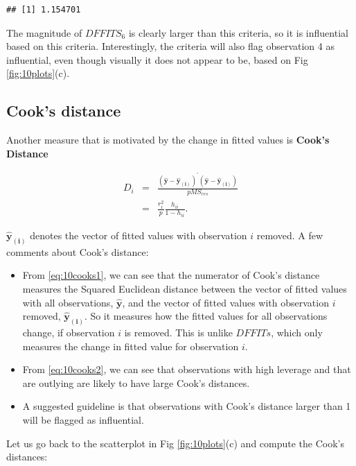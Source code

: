 \documentclass[
]{book}
\begin{document}
\begin{verbatim}
## [1] 1.154701
\end{verbatim}

The magnitude of \(DFFITS_6\) is clearly larger than this criteria, so it is influential based on this criteria. Interestingly, the criteria will also flag observation 4 as influential, even though visually it does not appear to be, based on Fig \ref{fig:10plots}(c).

\hypertarget{cooks-distance}{%
\subsection{Cook's distance}\label{cooks-distance}}

Another measure that is motivated by the change in fitted values is \textbf{Cook's Distance}

\begin{eqnarray}
D_i &=& \frac{\left( \boldsymbol{\hat{y}} - \boldsymbol{\hat{y}_{(i)}} \right)^{\prime} \left( \boldsymbol{\hat{y}} - \boldsymbol{\hat{y}_{(i)}} \right)}{p MS_{res}} \label{eq:10cooks1} \\
    &=& \frac{r_i^2}{p}\frac{h_{ii}}{1-h_{ii}}. \label{eq:10cooks2}
\end{eqnarray}

\(\boldsymbol{\hat{y}_{(i)}}\) denotes the vector of fitted values with observation \(i\) removed. A few comments about Cook's distance:

\begin{itemize}
\item
  From \eqref{eq:10cooks1}, we can see that the numerator of Cook's distance measures the Squared Euclidean distance between the vector of fitted values with all observations, \(\boldsymbol{\hat{y}}\), and the vector of fitted values with observation \(i\) removed, \(\boldsymbol{\hat{y}_{(i)}}\). So it measures how the fitted values for all observations change, if observation \(i\) is removed. This is unlike \(DFFITs\), which only measures the change in fitted value for observation \(i\).
\item
  From \eqref{eq:10cooks2}, we can see that observations with high leverage and that are outlying are likely to have large Cook's distances.
\item
  A suggested guideline is that observations with Cook's distance larger than 1 will be flagged as influential.
\end{itemize}

Let us go back to the scatterplot in Fig \ref{fig:10plots}(c) and compute the Cook's distances:
\end{document}
